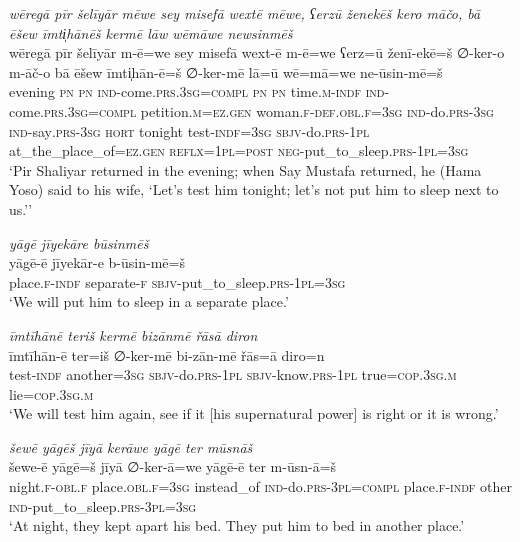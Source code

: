 \ea \label{ŽP.62}
\textit{wēregā pīr šelīyār mēwe sey misefā wextē mēwe, ʕerzū ženekēš kero māčo, bā ēšew īmti̩hānēš kermē lāw wēmāwe newsinmēš} \\ 
\gll wēregā pīr šelīyār m-ē=we sey misefā wext-ē m-ē=we ʕerz=ū ženī-ekē=š ∅-ker-o m-āč-o bā ēšew īmti̩hān-ē=š ∅-ker-mē lā=ū wē=mā=we ne-ūsin-mē=š \\ 
 evening \textsc{pn} \textsc{pn} \textsc{ind-}come\textsc{.prs}\textsc{.3sg}\textsc{=compl} \textsc{pn} \textsc{pn} time\textsc{.m}\textsc{-indf} \textsc{ind-}come\textsc{.prs}\textsc{.3sg}\textsc{=compl} petition\textsc{.m}\textsc{\textsc{=ez.gen}} woman\textsc{.f}\textsc{-def}\textsc{.obl}\textsc{.f}\textsc{=3sg} \textsc{ind-}do\textsc{.prs}\textsc{-3sg} \textsc{ind-}say\textsc{.prs}\textsc{-3sg} \textsc{hort} tonight test\textsc{-indf}\textsc{=3sg} \textsc{sbjv-}do\textsc{.prs}\textsc{-1pl} at\_the\_place\_of\textsc{\textsc{=ez.gen}} \textsc{reflx}\textsc{=1pl}\textsc{=\textsc{post}} \textsc{neg-}put\_to\_sleep\textsc{.prs}\textsc{-1pl}\textsc{=3sg} \\ 
\glt `Pir Shaliyar returned in the evening; when Say Mustafa returned, he (Hama Yoso) said to his wife, ‘Let’s test him tonight; let’s not put him to sleep next to us.’'
\z 
 
\ea \label{ŽP.63}
\textit{yāgē jīyekāre būsinmēš} \\ 
\gll yāgē-ē jīyekār-e b-ūsin-mē=š \\ 
 place\textsc{.f}\textsc{-indf} separate\textsc{-f} \textsc{sbjv-}put\_to\_sleep\textsc{.prs}\textsc{-1pl}\textsc{=3sg} \\ 
\glt `We will put him to sleep in a separate place.'
\z 
 
\ea \label{ŽP.64}
\textit{īmtīhānē teriš kermē bizānmē řāsā diron} \\ 
\gll īmtīhān-ē ter=iš ∅-ker-mē bi-zān-mē řās=ā diro=n \\ 
 test\textsc{-indf} another\textsc{=3sg} \textsc{sbjv-}do\textsc{.prs}\textsc{-1pl} \textsc{sbjv-}know\textsc{.prs}\textsc{-1pl} true\textsc{=cop}\textsc{.3sg}\textsc{.m} lie\textsc{=cop}\textsc{.3sg}\textsc{.m} \\ 
\glt `We will test him again, see if it [his supernatural power] is right or it is wrong.'
\z 
 
\ea \label{ŽP.65}
\textit{šewē yāgēš jīyā kerāwe yāgē ter mūsnāš} \\ 
\gll šewe-ē yāgē=š jīyā ∅-ker-ā=we yāgē-ē ter m-ūsn-ā=š \\ 
 night\textsc{.f}\textsc{-obl}\textsc{.f} place\textsc{.obl}\textsc{.f}\textsc{=3sg} instead\_of \textsc{ind-}do\textsc{.prs}\textsc{-3pl}\textsc{=compl} place\textsc{.f}\textsc{-indf} other \textsc{ind-}put\_to\_sleep\textsc{.prs}\textsc{-3pl}\textsc{=3sg} \\ 
\glt `At night, they kept apart his bed. They put him to bed in another place.'
\z 
 
